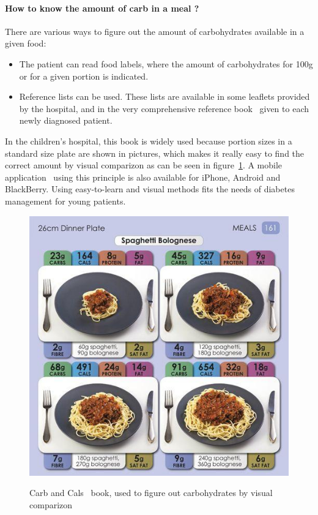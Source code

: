 \paragraph{How to know the amount of carb in a meal ?}
There are various ways to figure out the amount of carbohydrates available in a given food:
\begin{itemize}
\item The patient can read food labels, where the amount of carbohydrates for 100g or for a given portion is indicated.
\item Reference lists can be used. These lists are available in some leaflets provided by the hospital, and in the very comprehensive reference book~\cite{cheyette2010carbs} given to each newly diagnosed patient. 
\end{itemize}

In the children's hospital, this book is widely used because portion sizes in a standard size plate are shown in pictures, which makes it really easy to find the correct amount by visual comparizon as can be seen in figure~\ref{fig:bookImage}. A mobile application~\cite{carbcalsAppWebsite} using this principle is also available for iPhone, Android and BlackBerry. Using easy-to-learn and visual methods fits the needs of diabetes management for young patients.
\begin{figure}[h]
  \centering
  \caption{Carb and Cals~\cite{cheyette2010carbs} book, used to figure out carbohydrates by visual comparizon}
  \includegraphics[scale=1.2]{bookImage.jpg}
  \label{fig:bookImage}
\end{figure}

